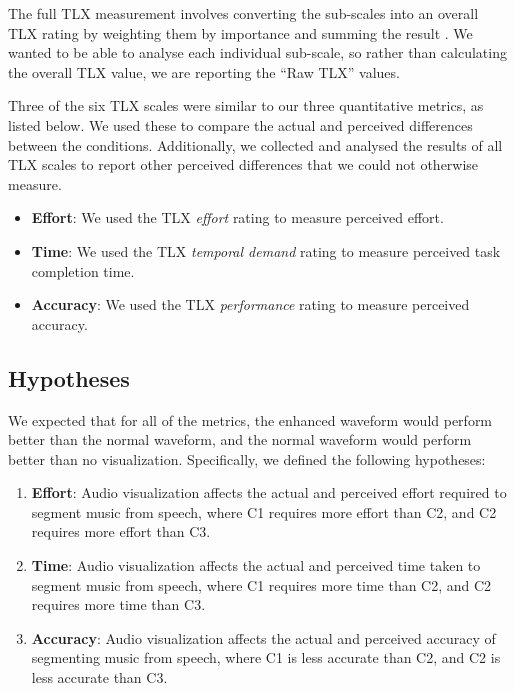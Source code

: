 The full TLX measurement involves converting the sub-scales into an overall TLX rating by weighting them by importance
and summing the result \citep{Hart2006}. We wanted to be able to analyse each individual sub-scale, so rather than
calculating the overall TLX value, we are reporting the ``Raw TLX'' values.

Three of the six TLX scales were similar to our three quantitative metrics, as listed below. We used these to
compare the actual and perceived differences between the conditions. Additionally, we collected and analysed the
results of all TLX scales to report other perceived differences that we could not otherwise measure.


\begin{itemize}
  \item \textbf{Effort}:
    We used the TLX \textit{effort} rating to measure perceived effort.
  \item \textbf{Time}:
    We used the TLX \textit{temporal demand} rating to measure perceived task completion time.
  \item \textbf{Accuracy}:
    We used the TLX \textit{performance} rating to measure perceived accuracy.
\end{itemize}


\subsection{Hypotheses}

We expected that for all of the metrics, the enhanced waveform would perform better than the normal waveform, and
the normal waveform would perform better than no visualization. Specifically, we defined the following hypotheses:

\newcommand{\subscript}[2]{$#1 _ #2$}
\begin{enumerate}[label=H\arabic*.]
  \item \textbf{Effort}: Audio visualization affects the actual and perceived effort required to segment music from
    speech, where C1 requires more effort than C2, and C2 requires more effort than C3.
  \item \textbf{Time}: Audio visualization affects the actual and perceived time taken to segment music from speech,
    where C1 requires more time than C2, and C2 requires more time than C3.
  \item \textbf{Accuracy}: Audio visualization affects the actual and perceived accuracy of segmenting music from
    speech, where C1 is less accurate than C2, and C2 is less accurate than C3.
\end{enumerate}


